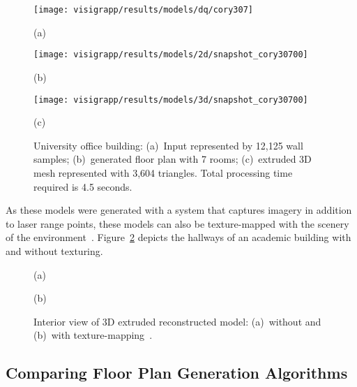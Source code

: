 \documentclass[12pt,onecolumn,oneside]{book}
\begin{document}
\begin{figure}[t]
	\centering
	
	\begin{minipage}[b]{0.35\linewidth}
	\centerline{\texttt{[image: visigrapp/results/models/dq/cory307]}}
	\centerline{(a)}
	\end{minipage}
	\hfill
	\begin{minipage}[b]{0.35\linewidth}
	\centerline{\texttt{[image: visigrapp/results/models/2d/snapshot\_cory30700]}}
	\centerline{(b)}
	\end{minipage}
	\begin{minipage}[b]{0.7\linewidth}
	\centerline{\texttt{[image: visigrapp/results/models/3d/snapshot\_cory30700]}}
	\centerline{(c)}
	\end{minipage}

	\caption[Floor plan of a university office area and hallway.]{University office building: (a)~Input represented by 12,125 wall samples; (b)~generated floor plan with 7 rooms; (c)~extruded 3D mesh represented with 3,604 triangles.  Total processing time required is 4.5 seconds.}
	\label{fig:visigrapp_results_e}
\end{figure}

As these models were generated with a system that captures imagery in addition to laser range points, these models can also be texture-mapped with the scenery of the environment~\cite{Cheng13}.  Figure~\ref{fig:visigrapp_texture} depicts the hallways of an academic building with and without texturing.

\begin{figure}[t]
   \centering
   \centerline{(a)}
   \hfill
   \centerline{(b)}
   \caption[Interior view of a texture-mapped extruded floor plan.]{Interior view of 3D extruded reconstructed model: (a)~without and (b)~with texture-mapping~\cite{Cheng13}.
   \protect
   \label{fig:visigrapp_texture}}
\end{figure}


\FloatBarrier
\subsection{Comparing Floor Plan Generation Algorithms}
\label{ssec:fp_results_compare}
\end{document}

